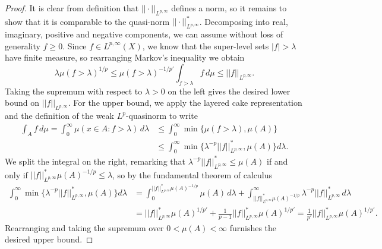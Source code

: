 \documentclass[reqno]{amsart}
\theoremstyle{definition}
\theoremstyle{remark}
\begin{document}
\begin{proof}
	It is clear from definition that $|| \cdot ||_{L^{p, \infty}}$ defines a norm, so it remains to show that it is comparable to the quasi-norm $||\cdot ||_{L^{p, \infty}}^*$. Decomposing into real, imaginary, positive and negative components, we can assume without loss of generality $f \geq 0$. Since $f \in L^{p, \infty} (X)$, we know that the super-level sets $|f| > \lambda$ have finite measure, so rearranging Markov's inequality we obtain
		\[ \lambda \mu(f> \lambda)^{1/p} \leq \mu(f > \lambda)^{-1/p'} \int_{f > \lambda} f \, d\mu \leq ||f||_{L^{p, \infty}}. \]	
	Taking the supremum with respect to $\lambda > 0$ on the left gives the desired lower bound on $||f||_{L^{p, \infty}}$. For the upper bound, we apply the layered cake representation and the definition of the weak $L^p$-quasinorm to write
		\begin{align*}
			\int_A f \, d \mu = \int_0^\infty \mu( x \in A : f > \lambda) \, d\lambda 
				&\leq \int_0^\infty \min \{  \mu( f > \lambda), \mu(A)\} \\
				&\leq \int_0^\infty \min \{ \lambda^{-p} ||f||_{L^{p, \infty}}^*, \mu(A) \} d \lambda.
		\end{align*}
	We split the integral on the right, remarking that $\lambda^{-p} ||f||_{L^{p, \infty}}^* \leq \mu(A)$ if and only if $||f||_{L^{p, \infty}}^* \mu(A)^{-1/p} \leq \lambda$, so by the fundamental theorem of calculus
		\begin{align*}
			 \int_0^\infty \min \{ \lambda^{-p} ||f||_{L^{p, \infty}}^*, \mu(A) \} d \lambda
			 	&= \int_0^{||f||_{L^{p, \infty}}^* \mu(A)^{-1/p}} \mu(A) \, d \lambda + \int_{||f||_{L^{p, \infty}}^* \mu(A)^{-1/p}}^\infty \lambda^{-p} ||f||_{L^{p, \infty}}^* \, d \lambda \\
			 	&=||f||_{L^{p, \infty}}^* \mu(A)^{1/p'} + \frac{1}{p - 1} ||f||_{L^{p, \infty}}^* \mu(A)^{1/p'} = \frac{1}{p'} ||f||_{L^{p, \infty}}^* \mu(A)^{1/p'}.
		\end{align*}
	Rearranging and taking the supremum over $0 < \mu(A) < \infty$ furnishes the desired upper bound. 	
\end{proof}
\end{document}
